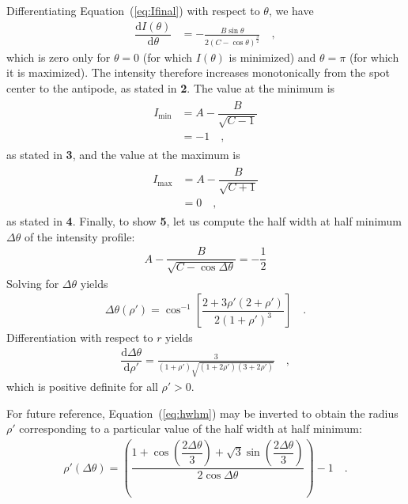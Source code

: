 \documentclass[modern]{aastex62}
\begin{document}
Differentiating Equation~(\ref{eq:Ifinal}) with respect to $\theta$, we have
%
\begin{align}
    \label{eq:Ideriv}
    \dfrac{\mathrm{d}I(\theta)}{\mathrm{d}\theta} & =
    -\frac{B\sin\theta}{2(C - \cos\theta)^\frac{3}{2}}
    \quad,
\end{align}
%
which is zero only for $\theta = 0$ (for which $I(\theta)$ is
minimized) and $\theta = \pi$ (for which it is maximized). The intensity
therefore increases monotonically from the spot center to the antipode,
as stated in \textbf{2}. The value at the minimum is
%
\begin{align}
    \begin{split}
        I_{\mathrm{min}} & = A - \dfrac{B}{\sqrt{C - 1}} \\
        & = -1
        \quad,
    \end{split}
\end{align}
%
as stated in \textbf{3}, and the value at the maximum is
%
\begin{align}
    \begin{split}
        I_{\mathrm{max}} & = A - \dfrac{B}{\sqrt{C + 1}} \\
        & = 0
        \quad,
    \end{split}
\end{align}
%
as stated in \textbf{4}.
Finally, to show \textbf{5}, let us compute the half width at half minimum
$\Delta\theta$ of the intensity profile:
%
\begin{align}
    A - \dfrac{B}{\sqrt{C - \cos{\Delta\theta}}} =
    -\dfrac{1}{2}
\end{align}
%
Solving for $\Delta\theta$ yields
%
\begin{align}
    \label{eq:hwhm}
    \Delta\theta(\rho') =
    \cos^{-1} \left[ \dfrac{2 + 3 \rho' (2 + \rho')}{2 (1 + \rho')^3} \right]
    \quad.
\end{align}
%
Differentiation with respect to $r$ yields
%
\begin{align}
    \dfrac{\mathrm{d}\Delta\theta}{\mathrm{d}\rho'} =
    \frac{3}{\left(1 + \rho'\right)
        \sqrt{\left(1 + 2 \rho'\right)
            \left(3 + 2 \rho'\right)}}
    \quad,
\end{align}
%
which is positive definite for all $\rho' > 0$.

For future reference, Equation~(\ref{eq:hwhm}) may be inverted to obtain the
radius $\rho'$ corresponding to a particular value of the half width
at half minimum:
%
\begin{align}
    \label{eq:hwhm}
    \rho'(\Delta\theta) =
    \left(\dfrac{1 +
        \cos\left(\dfrac{2\Delta\theta}{3}\right) +
        \sqrt{3}\sin\left(\dfrac{2\Delta\theta}{3}\right)}
    {2 \cos\Delta\theta}\right) - 1
    \quad.
\end{align}
%
\end{document}

